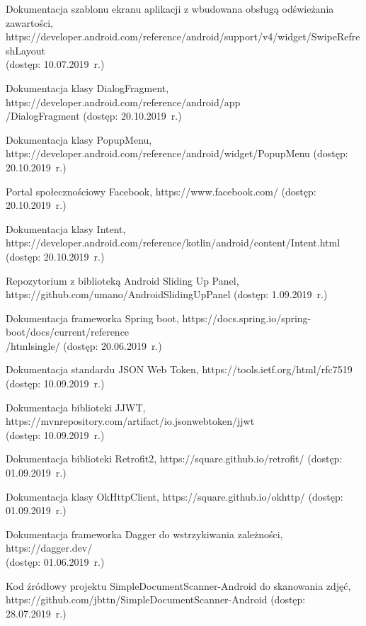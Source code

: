 \begin{thebibliography}{3}
   Dokumentacja szablonu ekranu aplikacji z wbudowana obsługą odświeżania zawartości, https://developer.android.com/reference/android/support/v4/widget/SwipeRefreshLayout \\(dostęp: 10.07.2019~r.)
  
   Dokumentacja klasy DialogFragment, https://developer.android.com/reference/android/app\\/DialogFragment (dostęp: 20.10.2019~r.)
  
   Dokumentacja klasy PopupMenu, https://developer.android.com/reference/android/widget/PopupMenu
  (dostęp: 20.10.2019~r.)
  
   Portal społecznościowy Facebook, https://www.facebook.com/ (dostęp: 20.10.2019~r.)
  
   Dokumentacja klasy Intent, https://developer.android.com/reference/kotlin/android/content/Intent.html (dostęp: 20.10.2019~r.)
  
   Repozytorium z biblioteką Android Sliding Up Panel, https://github.com/umano/AndroidSlidingUpPanel (dostęp: 1.09.2019~r.)
  
   Dokumentacja frameworka Spring boot, https://docs.spring.io/spring-boot/docs/current/reference\\/htmlsingle/ (dostęp: 20.06.2019~r.)
  
   Dokumentacja standardu JSON Web Token, https://tools.ietf.org/html/rfc7519 (dostęp: 10.09.2019~r.)

   Dokumentacja biblioteki JJWT, https://mvnrepository.com/artifact/io.jsonwebtoken/jjwt \\(dostęp: 10.09.2019~r.)

   Dokumentacja biblioteki Retrofit2, https://square.github.io/retrofit/ (dostęp: 01.09.2019~r.)

   Dokumentacja klasy OkHttpClient, https://square.github.io/okhttp/ (dostęp: 01.09.2019~r.)
  
   Dokumentacja frameworka Dagger do wstrzykiwania zależności, https://dagger.dev/ \\(dostęp: 01.06.2019~r.)
  
   Kod źródłowy projektu SimpleDocumentScanner-Android do skanowania zdjęć, https://github.com/jbttn/SimpleDocumentScanner-Android (dostęp: 28.07.2019~r.)
  

\end{thebibliography}
